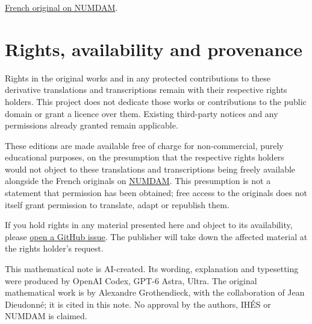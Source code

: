 \documentclass[11pt,a4paper]{article}
\begin{document}
\noindent\href{https://www.numdam.org/item/PMIHÉS_1961__8__5_0/}{French original on NUMDAM}.

\clearpage
\section*{Rights, availability and provenance}
Rights in the original works and in any protected contributions to these derivative translations and transcriptions remain with their respective rights holders. This project does not dedicate those works or contributions to the public domain or grant a licence over them. Existing third-party notices and any permissions already granted remain applicable.

These editions are made available free of charge for non-commercial, purely educational purposes, on the presumption that the respective rights holders would not object to these translations and transcriptions being freely available alongside the French originals on \href{https://www.numdam.org/journals/PMIHÉS/}{NUMDAM}. This presumption is not a statement that permission has been obtained; free access to the originals does not itself grant permission to translate, adapt or republish them.

If you hold rights in any material presented here and object to its availability, please \href{https://github.com/KokunoYumeto/ega-en/issues}{open a GitHub issue}. The publisher will take down the affected material at the rights holder's request.


This mathematical note is AI-created. Its wording, explanation and typesetting were produced by OpenAI Codex, GPT-6 Astra, Ultra. The original mathematical work is by Alexandre Grothendieck, with the collaboration of Jean Dieudonné; it is cited in this note. No approval by the authors, IHÉS or NUMDAM is claimed.
\end{document}
